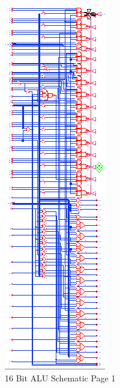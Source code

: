 \documentclass[11pt]{article}
\begin{document}
{		
		\begin{figure}[H]
			\centering
			\includegraphics[width=0.7\linewidth]{"Pictures/ALU-16Bit Schematic 1"}
			\caption{16 Bit ALU Schematic Page 1}
			\label{fig:alu-16bit-schematic-1}
		\end{figure}
	
}
\end{document}

